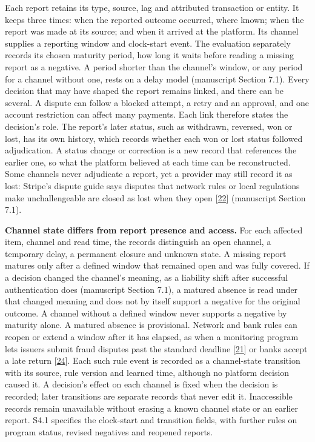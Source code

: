 \documentclass[
  11pt,
]{article}
\begin{document}
Each report retains its type, source, lag and attributed transaction or
entity. It keeps three times: when the reported outcome occurred, where
known; when the report was made at its source; and when it arrived at
the platform. Its channel supplies a reporting window and clock-start
event. The evaluation separately records its chosen maturity period, how
long it waits before reading a missing report as a negative. A period
shorter than the channel's window, or any period for a channel without
one, rests on a delay model (manuscript Section 7.1). Every decision
that may have shaped the report remains linked, and there can be
several. A dispute can follow a blocked attempt, a retry and an
approval, and one account restriction can affect many payments. Each
link therefore states the decision's role. The report's later status,
such as withdrawn, reversed, won or lost, has its own history, which
records whether each won or lost status followed adjudication. A status
change or correction is a new record that references the earlier one, so
what the platform believed at each time can be reconstructed. Some
channels never adjudicate a report, yet a provider may still record it
as lost: Stripe's dispute guide says disputes that network rules or
local regulations make unchallengeable are closed as lost when they open
{[}\protect\hyperlink{ref-Stripe2026Disputes}{22}{]} (manuscript Section
7.1).

\textbf{Channel state differs from report presence and access.} For each
affected item, channel and read time, the records distinguish an open
channel, a temporary delay, a permanent closure and unknown state. A
missing report matures only after a defined window that remained open
and was fully covered. If a decision changed the channel's meaning, as a
liability shift after successful authentication does (manuscript Section
7.1), a matured absence is read under that changed meaning and does not
by itself support a negative for the original outcome. A channel without
a defined window never supports a negative by maturity alone. A matured
absence is provisional. Network and bank rules can reopen or extend a
window after it has elapsed, as when a monitoring program lets issuers
submit fraud disputes past the standard deadline
{[}\protect\hyperlink{ref-Stripe2026MonitoringPrograms}{21}{]} or banks
accept a late return
{[}\protect\hyperlink{ref-Stripe2026ACHTerms}{24}{]}. Each such rule
event is recorded as a channel-state transition with its source, rule
version and learned time, although no platform decision caused it. A
decision's effect on each channel is fixed when the decision is
recorded; later transitions are separate records that never edit it.
Inaccessible records remain unavailable without erasing a known channel
state or an earlier report. S4.1 specifies the clock-start and
transition fields, with further rules on program status, revised
negatives and reopened reports.
\end{document}
